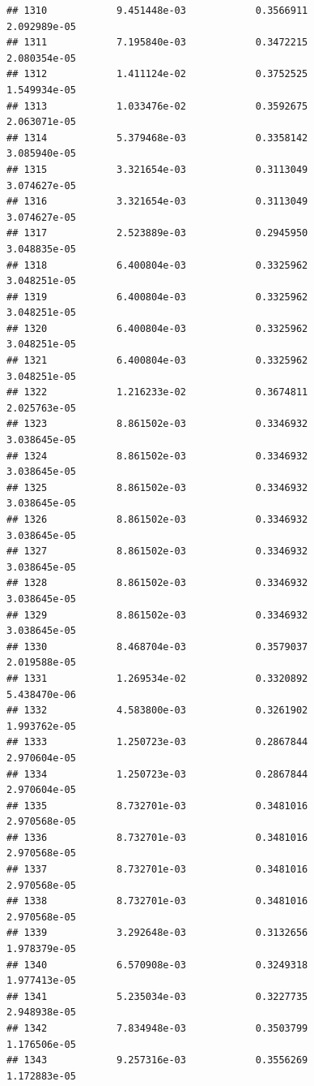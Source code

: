 \documentclass[
]{article}
\begin{document}
\begin{verbatim}
## 1310            9.451448e-03            0.3566911            2.092989e-05
## 1311            7.195840e-03            0.3472215            2.080354e-05
## 1312            1.411124e-02            0.3752525            1.549934e-05
## 1313            1.033476e-02            0.3592675            2.063071e-05
## 1314            5.379468e-03            0.3358142            3.085940e-05
## 1315            3.321654e-03            0.3113049            3.074627e-05
## 1316            3.321654e-03            0.3113049            3.074627e-05
## 1317            2.523889e-03            0.2945950            3.048835e-05
## 1318            6.400804e-03            0.3325962            3.048251e-05
## 1319            6.400804e-03            0.3325962            3.048251e-05
## 1320            6.400804e-03            0.3325962            3.048251e-05
## 1321            6.400804e-03            0.3325962            3.048251e-05
## 1322            1.216233e-02            0.3674811            2.025763e-05
## 1323            8.861502e-03            0.3346932            3.038645e-05
## 1324            8.861502e-03            0.3346932            3.038645e-05
## 1325            8.861502e-03            0.3346932            3.038645e-05
## 1326            8.861502e-03            0.3346932            3.038645e-05
## 1327            8.861502e-03            0.3346932            3.038645e-05
## 1328            8.861502e-03            0.3346932            3.038645e-05
## 1329            8.861502e-03            0.3346932            3.038645e-05
## 1330            8.468704e-03            0.3579037            2.019588e-05
## 1331            1.269534e-02            0.3320892            5.438470e-06
## 1332            4.583800e-03            0.3261902            1.993762e-05
## 1333            1.250723e-03            0.2867844            2.970604e-05
## 1334            1.250723e-03            0.2867844            2.970604e-05
## 1335            8.732701e-03            0.3481016            2.970568e-05
## 1336            8.732701e-03            0.3481016            2.970568e-05
## 1337            8.732701e-03            0.3481016            2.970568e-05
## 1338            8.732701e-03            0.3481016            2.970568e-05
## 1339            3.292648e-03            0.3132656            1.978379e-05
## 1340            6.570908e-03            0.3249318            1.977413e-05
## 1341            5.235034e-03            0.3227735            2.948938e-05
## 1342            7.834948e-03            0.3503799            1.176506e-05
## 1343            9.257316e-03            0.3556269            1.172883e-05

\end{verbatim}
\end{document}
